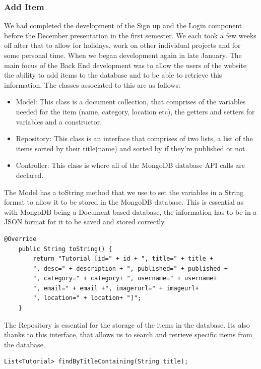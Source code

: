 \subsubsection{Add Item}
We had completed the development of the  Sign up and the Login component before the December presentation in the first semester. We each took a few weeks off after that to allow for holidays, work on other individual projects and for some personal time. When we began development again in late January. The main focus of the Back End development was to allow the users of the website the ability to add items to the database and to be able to retrieve this information. The classes associated to this are as follows: \par
\begin{itemize}
    \item Model: This class is a document collection, that comprises of the variables needed for the item (name, category, location etc), the getters and setters for variables and a constructor.
    \item Repository: This class is an interface that comprises of two lists, a list of the items sorted by their title(name) and sorted by if they're published or not.
    \item Controller: This class is where all of the MongoDB database API calls are declared.
\end{itemize}
\par The Model has a toString method that we use to set the variables in a String format to allow it to be stored in the MongoDB database. This is essential as with MongoDB being a Document based database, the information has to be in a JSON format for it to be saved and stored correctly. \par
\begin{verbatim}
@Override
    public String toString() {
        return "Tutorial [id=" + id + ", title=" + title + 
        ", desc=" + description + ", published=" + published +
        ", category=" + category+ ", username=" + username+ 
        ", email=" + email +", imagerurl=" + imageurl+ 
        ", location=" + location+ "]";
    }
\end{verbatim}
The Repository is essential for the storage of the items in the database. Its also thanks to this interface, that allows us to search and retrieve specific items from the database. \par
\begin{verbatim}
List<Tutorial> findByTitleContaining(String title);
\end{verbatim}
